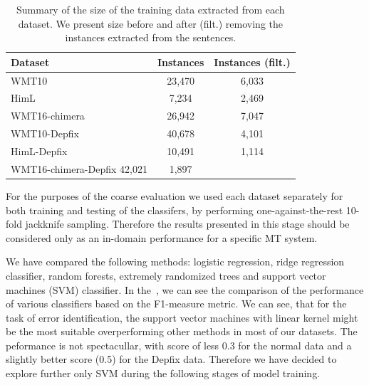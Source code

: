 \begin{table}[t]
\centering
\small

\begin{tabular}{lcc}
Dataset  &  \hash{} Instances  &  \hash{} Instances (filt.)  \\
\hline
WMT10  &  23,470  &  6,033  \\
HimL  & 7,234  &  2,469  \\
WMT16-chimera  &  26,942  &  7,047  \\
WMT10-Depfix  &  40,678  &  4,101  \\
HimL-Depfix  &  10,491  &  1,114  \\
WMT16-chimera-Depfix  42,021  &  1,897  \\
\end{tabular}
\caption{
    Summary of the size of the training data extracted from each dataset. We present
size before and after (filt.) removing the instances extracted from the  sentences.
}
\label{wf-training-sum}
\end{table}


For the purposes of the coarse evaluation we used each dataset separately for both training
and testing of the classifers, by performing one-against-the-rest 10-fold jackknife sampling.
Therefore the results presented in this stage should be considered only as an in-domain
performance for a specific MT system.

We have compared the following methods: logistic regression, ridge regression classifier,
random forests, extremely randomized trees and support vector machines (SVM) classifier.
In the~, we can see the comparison of the performance of various classifiers based
on the F1-measure metric. We can see, that for the task of error identification, the support vector
machines with linear kernel might be the most suitable overperforming other methods in most of our
datasets. The  peformance is not spectacullar, with score of less 0.3 for the normal data
and a slightly better score (\tilda{}0.5) for the Depfix data. Therefore we have decided to explore
further only SVM during the following stages of model training.

